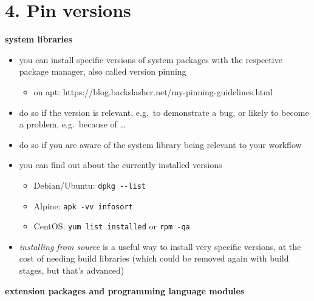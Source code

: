 \documentclass[10pt,letterpaper]{article}
\providecommand{\tightlist}{%
  \setlength{\itemsep}{0pt}\setlength{\parskip}{0pt}}
\begin{document}
\hypertarget{pin-versions}{%
\section*{4. Pin versions}\label{pin-versions}}

\textbf{system libraries}

\begin{itemize}
\tightlist
\item
  you can install specific versions of system packages with the
  respective package manager, also called version pinning

  \begin{itemize}
  \tightlist
  \item
    on apt: https://blog.backslasher.net/my-pinning-guidelines.html
  \end{itemize}
\item
  do so if the version is relevant, e.g.~to demonstrate a bug, or likely
  to become a problem, e.g.~because of \ldots{}
\item
  do so if you are aware of the system library being relevant to your
  workflow
\item
  you can find out about the currently installed versions

  \begin{itemize}
  \tightlist
  \item
    Debian/Ubuntu: \texttt{dpkg\ -\/-list}
  \item
    Alpine: \texttt{apk\ -vv\ info\textbar{}sort}
  \item
    CentOS: \texttt{yum\ list\ installed} or \texttt{rpm\ -qa}
  \end{itemize}
\item
  \emph{installing from source} is a useful way to install very specific
  versions, at the cost of needing build libraries (which could be
  removed again with build stages, but that's advanced)
\end{itemize}

\textbf{extension packages and programming language modules}
\end{document}
